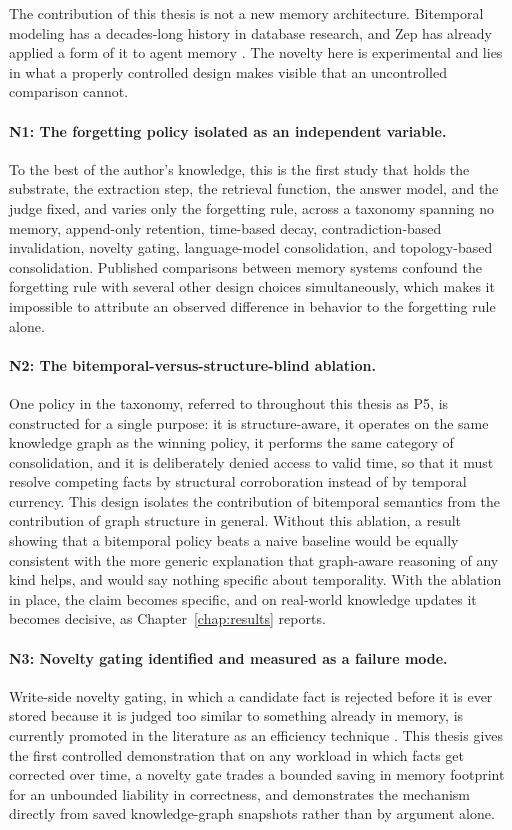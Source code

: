 The contribution of this thesis is not a new memory architecture. Bitemporal modeling has a decades-long history in database research, and Zep has already applied a form of it to agent memory \citep{rasmussen2025zep}. The novelty here is experimental and lies in what a properly controlled design makes visible that an uncontrolled comparison cannot.

\paragraph{N1: The forgetting policy isolated as an independent variable.} To the best of the author's knowledge, this is the first study that holds the substrate, the extraction step, the retrieval function, the answer model, and the judge fixed, and varies only the forgetting rule, across a taxonomy spanning no memory, append-only retention, time-based decay, contradiction-based invalidation, novelty gating, language-model consolidation, and topology-based consolidation. Published comparisons between memory systems confound the forgetting rule with several other design choices simultaneously, which makes it impossible to attribute an observed difference in behavior to the forgetting rule alone.

\paragraph{N2: The bitemporal-versus-structure-blind ablation.} One policy in the taxonomy, referred to throughout this thesis as P5, is constructed for a single purpose: it is structure-aware, it operates on the same knowledge graph as the winning policy, it performs the same category of consolidation, and it is deliberately denied access to valid time, so that it must resolve competing facts by structural corroboration instead of by temporal currency. This design isolates the contribution of bitemporal semantics from the contribution of graph structure in general. Without this ablation, a result showing that a bitemporal policy beats a naive baseline would be equally consistent with the more generic explanation that graph-aware reasoning of any kind helps, and would say nothing specific about temporality. With the ablation in place, the claim becomes specific, and on real-world knowledge updates it becomes decisive, as Chapter~\ref{chap:results} reports.

\paragraph{N3: Novelty gating identified and measured as a failure mode.} Write-side novelty gating, in which a candidate fact is rejected before it is ever stored because it is judged too similar to something already in memory, is currently promoted in the literature as an efficiency technique \citep{wang2026sage}. This thesis gives the first controlled demonstration that on any workload in which facts get corrected over time, a novelty gate trades a bounded saving in memory footprint for an unbounded liability in correctness, and demonstrates the mechanism directly from saved knowledge-graph snapshots rather than by argument alone.

